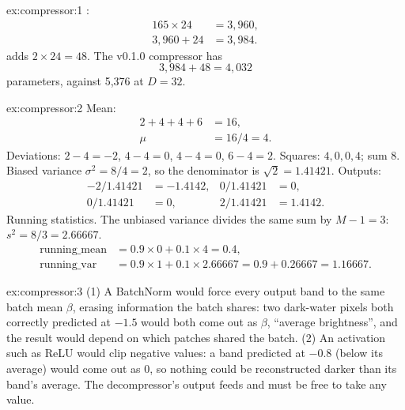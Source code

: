 
\begin{solution}{ex:compressor:1}
:
\begin{align*}
165\times24 &= 3{,}960,\\
3{,}960 + 24 &= 3{,}984.
\end{align*}
 adds $2\times24 = 48$. The v0.1.0 compressor has
\[
3{,}984 + 48 = 4{,}032
\]
parameters, against 5{,}376 at $D=32$.
\end{solution}

\begin{solution}{ex:compressor:2}
Mean:
\begin{align*}
2 + 4 + 4 + 6 &= 16,\\
\mu &= 16/4 = 4.
\end{align*}
Deviations: $2-4=-2$, $4-4=0$, $4-4=0$, $6-4=2$. Squares: $4, 0, 0, 4$; sum $8$. Biased variance
$\sigma^2 = 8/4 = 2$, so the denominator is $\sqrt{2} = 1.41421$. Outputs:
\begin{align*}
-2/1.41421 &= -1.4142, & 0/1.41421 &= 0,\\
0/1.41421 &= 0, & 2/1.41421 &= 1.4142.
\end{align*}
Running statistics. The unbiased variance divides the same sum by $M-1 = 3$: $s^2 = 8/3 = 2.66667$.
\begin{align*}
\text{running\_mean} &= 0.9\times0 + 0.1\times4 = 0.4,\\
\text{running\_var} &= 0.9\times1 + 0.1\times2.66667 = 0.9 + 0.26667 = 1.16667.
\end{align*}
\end{solution}

\begin{solution}{ex:compressor:3}
(1) A BatchNorm would force every output band to the same batch mean $\beta$, erasing information the
batch shares: two dark-water pixels both correctly predicted at $-1.5$ would both come out as $\beta$,
``average brightness'', and the result would depend on which patches shared the batch. (2) An activation
such as ReLU would clip negative values: a band predicted at $-0.8$ (below its average) would come out
as $0$, so nothing could be reconstructed darker than its band's average. The decompressor's output feeds
 and must be free to take any value.
\end{solution}

